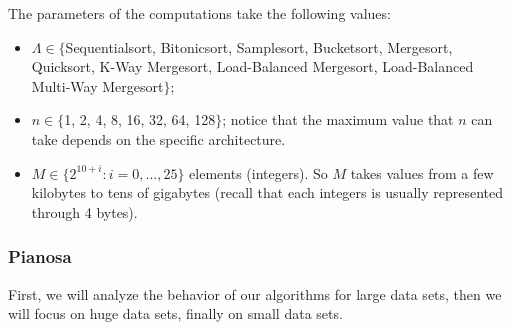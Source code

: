 The parameters of the computations take the following values:
\begin{itemize}
\item $\Lambda \in \lbrace$Sequentialsort, Bitonicsort, Samplesort, Bucketsort, Mergesort, Quicksort, K-Way Mergesort, Load-Balanced Mergesort, Load-Balanced Multi-Way Mergesort$\rbrace$;
\item $n \in \lbrace$1, 2, 4, 8, 16, 32, 64, 128$\rbrace$; notice that the maximum value that $n$ can take depends on the specific architecture. 
\item $M \in \lbrace 2^{10 + i} : i = 0, ..., 25\rbrace$ elements (integers). So $M$ takes values from a few kilobytes to tens of gigabytes (recall that each integers is usually represented through 4 bytes).
\end{itemize} 

\subsubsection{Pianosa}
First, we will analyze the behavior of our algorithms for large data sets, then we will focus on huge data sets, finally on small data sets. 

